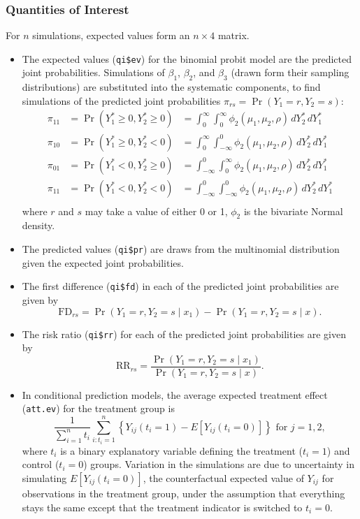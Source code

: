 \documentclass{article}
\begin{document}
\subsubsection{Quantities of Interest}
For $n$ simulations, expected values form an $n \times 4$
matrix.  
\begin{itemize}
\item The expected values ({\tt qi\$ev}) for the binomial probit model
  are the predicted joint probabilities. Simulations of $\beta_1$,
  $\beta_2$, and $\beta_3$ (drawn form their sampling distributions)
  are substituted into the systematic components, to find simulations
  of the predicted joint probabilities $\pi_{rs}=\Pr(Y_1=r, Y_2=s)$:
\begin{eqnarray*}
\pi_{11} &= \Pr(Y_1^* \geq 0 , Y_2^* \geq 0) &= \int_0^{\infty}
\int_0^{\infty} \phi_2 (\mu_1, \mu_2, \rho) \, dY_2^*\, dY_1^* \\
\pi_{10} &= \Pr(Y_1^* \geq 0 , Y_2^* < 0)  &= \int_0^{\infty}
\int_{-\infty}^{0} \phi_2 (\mu_1, \mu_2, \rho) \, dY_2^*\, dY_1^*\\
\pi_{01} &= \Pr(Y_1^* < 0 , Y_2^* \geq 0)  &= \int_{-\infty}^{0}
\int_0^{\infty} \phi_2 (\mu_1, \mu_2, \rho) \, dY_2^*\, dY_1^*\\
\pi_{11} &= \Pr(Y_1^* < 0 , Y_2^* < 0)  &= \int_{-\infty}^{0}
\int_{-\infty}^{0} \phi_2 (\mu_1, \mu_2, \rho) \, dY_2^*\, dY_1^*\\
\end{eqnarray*}
where $r$ and $s$ may take a value of either 0 or 1, $\phi_2$ is the
bivariate Normal density.
  
\item The predicted values ({\tt qi\$pr}) are draws from the
  multinomial distribution given the expected joint probabilities.  

\item The first difference ({\tt qi\$fd}) in each of the predicted joint
  probabilities are given by
  $$\textrm{FD}_{rs} = \Pr(Y_1=r, Y_2=s \mid x_1)-\Pr(Y_1=r, Y_2=s
  \mid x).$$
  
\item The risk ratio ({\tt qi\$rr}) for each of the predicted joint
  probabilities are given by
\begin{equation*}
\textrm{RR}_{rs} = \frac{\Pr(Y_1=r, Y_2=s \mid x_1)}{\Pr(Y_1=r, Y_2=s \mid x)}.
\end{equation*}

\item In conditional prediction models, the average expected treatment
  effect ({\tt att.ev}) for the treatment group is 
    \begin{equation*} \frac{1}{\sum_{i=1}^n t_i}\sum_{i:t_i=1}^n \left\{ Y_{ij}(t_i=1) -
      E[Y_{ij}(t_i=0)] \right\} \textrm{ for } j = 1,2,
    \end{equation*} 
    where $t_i$ is a binary explanatory variable defining the treatment
    ($t_i=1$) and control ($t_i=0$) groups.  Variation in the
    simulations are due to uncertainty in simulating $E[Y_{ij}(t_i=0)]$,
    the counterfactual expected value of $Y_{ij}$ for observations in the
    treatment group, under the assumption that everything stays the
    same except that the treatment indicator is switched to $t_i=0$.


\end{itemize}
\end{document}

